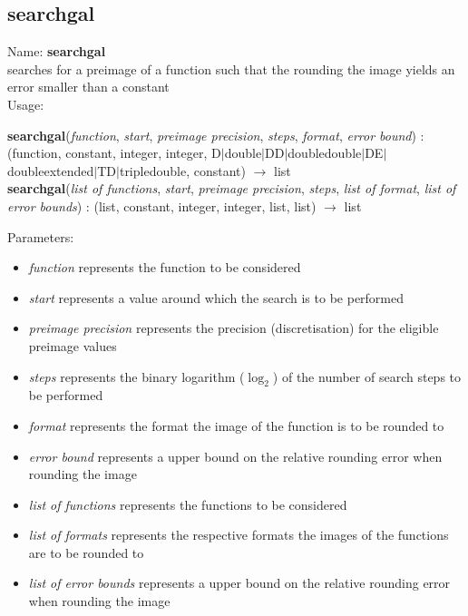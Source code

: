 \subsection{searchgal}
\label{labsearchgal}
\noindent Name: \textbf{searchgal}\\
searches for a preimage of a function such that the rounding the image yields an error smaller than a constant\\
\noindent Usage: 
\begin{center}
\textbf{searchgal}(\emph{function}, \emph{start}, \emph{preimage precision}, \emph{steps}, \emph{format}, \emph{error bound}) : (\textsf{function}, \textsf{constant}, \textsf{integer}, \textsf{integer}, \textsf{D$|$double$|$DD$|$doubledouble$|$DE$|$doubleextended$|$TD$|$tripledouble}, \textsf{constant}) $\rightarrow$ \textsf{list}
\\ 
\textbf{searchgal}(\emph{list of functions}, \emph{start}, \emph{preimage precision}, \emph{steps}, \emph{list of format}, \emph{list of error bounds}) : (\textsf{list}, \textsf{constant}, \textsf{integer}, \textsf{integer}, \textsf{list}, \textsf{list}) $\rightarrow$ \textsf{list}
\\ 
\end{center}
Parameters: 
\begin{itemize}
\item \emph{function} represents the function to be considered
\item \emph{start} represents a value around which the search is to be performed
\item \emph{preimage precision} represents the precision (discretisation) for the eligible preimage values
\item \emph{steps} represents the binary logarithm ($\log_2$) of the number of search steps to be performed
\item \emph{format} represents the format the image of the function is to be rounded to
\item \emph{error bound} represents a upper bound on the relative rounding error when rounding the image
\item \emph{list of functions} represents the functions to be considered
\item \emph{list of formats} represents the respective formats the images of the functions are to be rounded to
\item \emph{list of error bounds} represents a upper bound on the relative rounding error when rounding the image
\end{itemize}
